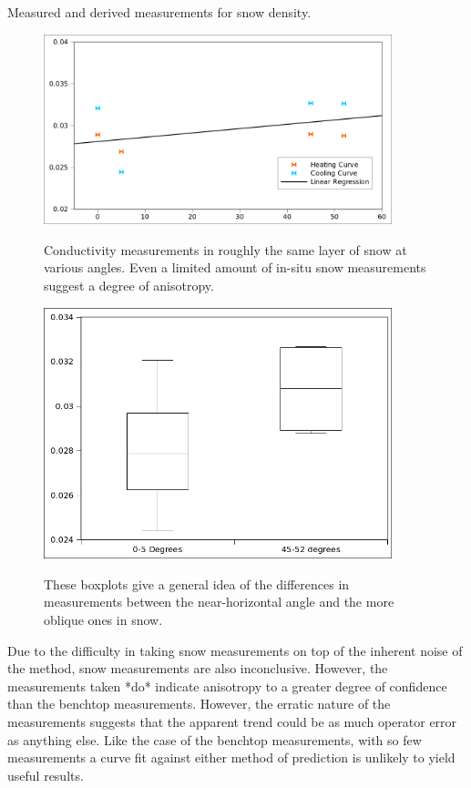 \begin{table}[h]
\centering

\label{tab:density}
\caption{Measured and derived measurements for snow density.}
\end{table}

\begin{figure}[h]
\centering
\includegraphics[width=0.9\textwidth]{fig/snow_meas.png}
\label{fig:test_results}
\caption{Conductivity measurements in roughly the same layer of snow at various 
angles. Even a limited amount of in-situ snow measurements suggest a degree of
anisotropy.}
\end{figure}

\begin{figure}[h]
\centering
\includegraphics[width=0.9\textwidth]{fig/snow_meas_boxplot.png}
\label{fig:test_boxplot}
\caption{These boxplots give a general idea of the differences in measurements
between the near-horizontal angle and the more oblique ones in snow.}
\end{figure}


Due to the difficulty in taking snow measurements on top of the inherent noise
of the method, snow measurements are also inconclusive. However, the
measurements taken *do* indicate anisotropy to a greater degree of confidence
than the benchtop measurements. However, the erratic nature of
the measurements suggests that the apparent trend could be as much operator
error as anything else. Like the case of the benchtop measurements, with so few
measurements a curve fit against either method of prediction is unlikely to
yield useful results.
